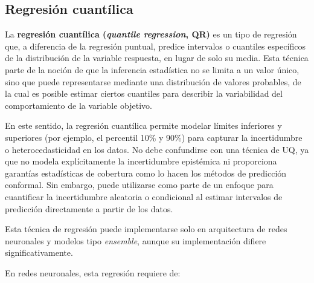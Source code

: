 
\subsection{Regresión cuantílica}

La \textbf{regresión cuantílica (\textit{quantile regression}, \acrshort{QR})} es un tipo de regresión que, a diferencia de la regresión puntual, predice intervalos o cuantiles específicos de la distribución de la variable respuesta, en lugar de solo su media. Esta técnica parte de la noción de que la inferencia estadística no se limita a un valor único, sino que puede representarse mediante una distribución de valores probables, de la cual es posible estimar ciertos cuantiles para describir la variabilidad del comportamiento de la variable objetivo.

En este sentido, la regresión cuantílica permite modelar límites inferiores y superiores (por ejemplo, el percentil 10\% y 90\%) para capturar la incertidumbre o heterocedasticidad en los datos. No debe confundirse con una técnica de \acrshort{UQ}, ya que no modela explícitamente la incertidumbre epistémica ni proporciona garantías estadísticas de cobertura como lo hacen los métodos de predicción conformal. Sin embargo, puede utilizarse como parte de un enfoque para cuantificar la incertidumbre aleatoria o condicional al estimar intervalos de predicción directamente a partir de los datos.

Esta técnica de regresión puede implementarse solo en arquitectura de redes neuronales y modelos tipo \textit{ensemble}, aunque su implementación difiere significativamente. 

En redes neuronales, esta regresión requiere de:

